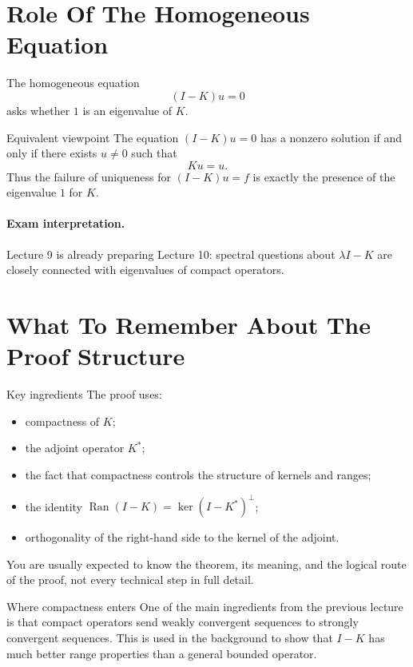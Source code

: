 \documentclass[header={Lecture 9 Exam Study Notes}]{study-note}
\begin{document}
\section{Role Of The Homogeneous Equation}

\begin{focusbox}
The homogeneous equation
\[
(I-K)u=0
\]
asks whether $1$ is an eigenvalue of $K$.
\end{focusbox}

\begin{thmbox}{Equivalent viewpoint}
The equation $(I-K)u=0$ has a nonzero solution if and only if there exists $u\neq 0$ such that
\[
Ku=u.
\]
Thus the failure of uniqueness for $(I-K)u=f$ is exactly the presence of the eigenvalue $1$ for $K$.
\end{thmbox}

\paragraph{Exam interpretation.}
Lecture 9 is already preparing Lecture 10: spectral questions about $\lambda I-K$ are closely connected with eigenvalues of compact operators.

\section{What To Remember About The Proof Structure}

\begin{exbox}{Key ingredients}
The proof uses:
\begin{itemize}
\item compactness of $K$;
\item the adjoint operator $K^*$;
\item the fact that compactness controls the structure of kernels and ranges;
\item the identity $\operatorname{Ran}(I-K)=\ker(I-K^*)^{\perp}$;
\item orthogonality of the right-hand side to the kernel of the adjoint.
\end{itemize}
You are usually expected to know the theorem, its meaning, and the logical route of the proof, not every technical step in full detail.
\end{exbox}

\begin{warningbox}{Where compactness enters}
One of the main ingredients from the previous lecture is that compact operators send weakly convergent sequences to strongly convergent sequences. This is used in the background to show that $I-K$ has much better range properties than a general bounded operator.
\end{warningbox}
\end{document}
